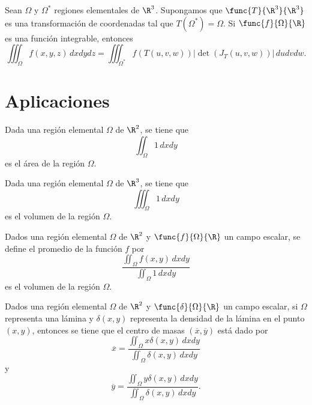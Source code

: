 \documentclass[a4,11pt]{aleph-notas}
\begin{document}
\begin{prop}
    Sean $\Omega$ y $\Omega^*$ regiones elementales de $\R^3$. Supongamos que $\func{T}{\R^3}{\R^3}$ es una transformación de coordenadas tal que $T(\Omega^*)=\Omega$. Si $\func{f}{\Omega}{\R}$ es una función integrable, entonces
    \[
        \iiint_\Omega f(x,y,z)\, dxdydz = \iiint_{\Omega^*} f(T(u,v,w)) \left|\det(J_T(u,v,w) )\right| \, dudvdw.
    \]
\end{prop}


\section{Aplicaciones}


\begin{advertencia}
    Dada una región elemental $\Omega$ de $\R^2$, se tiene que
    \[
        \iint_\Omega 1\, dxdy
    \]
    es el área de la región $\Omega$.
\end{advertencia}

\begin{advertencia}
    Dada una región elemental $\Omega$ de $\R^3$, se tiene que
    \[
        \iiint_\Omega 1\, dxdy
    \]
    es el volumen de la región $\Omega$.
\end{advertencia}
   
\begin{defi}
    Dados una región elemental $\Omega$ de $\R^2$ y $\func{f}{\Omega}{\R}$ un campo escalar, se define el promedio de la función $f$ por
    \[
        \frac{\iint_\Omega f(x,y)\, dxdy}{\iint_\Omega 1\, dxdy}
    \]
    es el volumen de la región $\Omega$.
\end{defi}
   
\begin{advertencia}
    Dados una región elemental $\Omega$ de $\R^2$ y $\func{\delta}{\Omega}{\R}$ un campo escalar, si $\Omega$ representa una lámina y $\delta(x,y)$ representa la densidad de la lámina en el punto $(x,y)$, entonces se tiene que el centro de masas $(\overline{x},\overline{y})$ está dado por
    \[
        \overline{x}=
        \frac{\iint_\Omega x\delta(x,y)\, dxdy}
        {\iint_\Omega \delta(x,y)\, dxdy}
    \]
    y
    \[
        \overline{y}=
        \frac{\iint_\Omega y\delta(x,y)\, dxdy}
        {\iint_\Omega \delta(x,y)\, dxdy}.
    \]
\end{advertencia}
   
\end{document}
